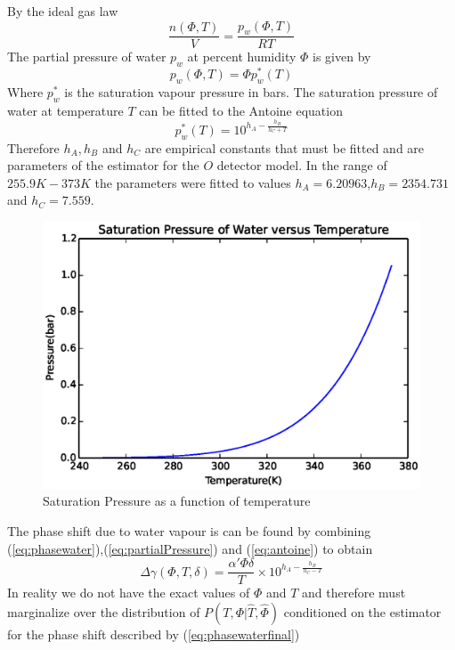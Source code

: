 By the ideal gas law 
\begin{equation}
\frac{n(\Phi,T)}{V} = \frac{p_w(\Phi,T)}{RT}
\end{equation}
The partial pressure of water $p_w$ at percent humidity $\Phi$ is given by 
\begin{equation}
p_w(\Phi,T) = \Phi p^*_w(T)
\label{eq:partialPressure}
\end{equation}
Where $p^*_w$ is the saturation vapour pressure in bars.\cite{relativehumidity} The saturation pressure of water at temperature $T$ can be fitted to the Antoine equation \cite{antoineequation}
\begin{equation}
\label{eq:antoine}
p^*_w(T) = 10^{h_A - \frac{h_B}{h_C + T}}
\end{equation} 
Therefore $h_A,h_B$ and $h_C$ are empirical constants that must be fitted and are parameters of the estimator for the $O$ detector model. In the range of $255.9K-373K$ the parameters were fitted to values $h_A=6.20963$,$h_B=2354.731$ and $h_C=7.559$.\cite{antoineequation} 
\begin{figure}[ht!]
\centering
\includegraphics[scale=1.0]{Figures/antoine.eps}
\caption{Saturation Pressure as a function of temperature}
\label{fig:antoine}
\end{figure}
The phase shift due to water vapour is can be found by combining (\ref{eq:phasewater}),(\ref{eq:partialPressure}) and (\ref{eq:antoine}) to obtain
\begin{equation}
\Delta\gamma(\Phi,T,\delta) = \frac{\alpha'\Phi\delta}{T}\times 10^{h_A - \frac{h_B}{h_C - T}}
\label{eq:phasewaterfinal}
\end{equation}
In reality we do not have the exact values of $\Phi$ and $T$ and therefore must marginalize over the distribution of $P(T,\Phi|\hat{T},\hat{\Phi})$ conditioned on the estimator for the phase shift described by (\ref{eq:phasewaterfinal})
